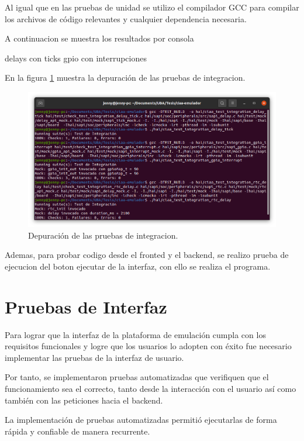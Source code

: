 Al igual que en las pruebas de unidad se utilizo el compilador GCC para compilar los archivos de código relevantes y cualquier dependencia necesaria.

A continuacion se muestra los resultados por consola


delays con ticks
gpio con interrupciones

En la figura \ref{fig:PruebasIntegracion} muestra la depuración de las pruebas de integracion.
\begin{figure}[ht]
	\centering
	\includegraphics[scale=.35]{./Figures/PruebasIntegracion.png}
	\caption{Depuración de las pruebas de integracion.}
	\label{fig:PruebasIntegracion}
\end{figure}

Ademas, para probar codigo desde el fronted y el backend, se realizo prueba de ejecucion del boton ejecutar de la interfaz, con ello se realiza el programa.



\section{Pruebas de Interfaz}
\label{sec:Pruebas de Interfaz}

Para lograr que la interfaz de la plataforma de emulación cumpla con los requisitos funcionales y logre que los usuarios lo adopten con éxito fue necesario implementar las pruebas de la interfaz de usuario.

Por tanto, se implementaron pruebas automatizadas que verifiquen que el funcionamiento sea el correcto, tanto desde la interacción con el usuario así como también con las peticiones hacia el backend.

La implementación de pruebas automatizadas permitió ejecutarlas de forma rápida y confiable de manera recurrente. 

